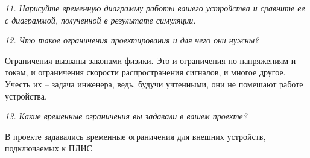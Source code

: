\begin{sloppypar}
\textit {11. Нарисуйте временную диаграмму работы вашего устройства и сравните ее с диаграммой, полученной в результате симуляции.}


\textit {12. Что такое ограничения проектирования и для чего они нужны?}

Ограничения вызваны законами физики.  Это и ограничения по напряжениям и токам, и ограничения скорости распространения сигналов, и многое другое. Учесть их -- задача инженера, ведь, будучи учтенными, они не помешают работе устройства. 

\textit {13. Какие временные ограничения вы задавали в вашем проекте?}

В проекте задавались временные ограничения для внешних устройств, подключаемых  к ПЛИС



% 
% 


\end{sloppypar}
